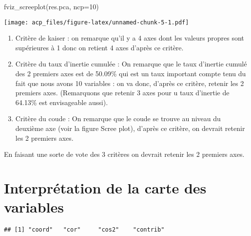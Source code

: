 \documentclass[
]{article}
\newenvironment{Shaded}{\begin{snugshade}}{\end{snugshade}}
\newcommand{\AttributeTok}[1]{\textcolor[rgb]{0.77,0.63,0.00}{#1}}
\newcommand{\DecValTok}[1]{\textcolor[rgb]{0.00,0.00,0.81}{#1}}
\newcommand{\FunctionTok}[1]{\textcolor[rgb]{0.00,0.00,0.00}{#1}}
\newcommand{\NormalTok}[1]{#1}
\newcommand{\SpecialCharTok}[1]{\textcolor[rgb]{0.00,0.00,0.00}{#1}}
\begin{document}
\begin{Shaded}
\begin{Highlighting}[]
\FunctionTok{fviz\_screeplot}\NormalTok{(res.pca, }\AttributeTok{ncp=}\DecValTok{10}\NormalTok{)}
\end{Highlighting}
\end{Shaded}

\texttt{[image: acp\_files/figure-latex/unnamed-chunk-5-1.pdf]}

\begin{enumerate}
\def\labelenumi{\alph{enumi})}
\item
  Critère de kaiser : on remarque qu'il y a 4 axes dont les valeurs
  propres sont supérieures à 1 donc on retient 4 axes d'après ce
  critère.
\item
  Critère du taux d'inertie cumulée : On remarque que le taux d'inertie
  cumulé des 2 premiers axes est de 50.09\% qui est un taux important
  compte tenu du fait que nous avons 10 variables : on va donc, d'après
  ce critère, retenir les 2 premiers axes. (Remarquons que retenir 3
  axes pour u taux d'inertie de 64.13\% est envisageable aussi).
\item
  Critère du coude : On remarque que le coude se trouve au niveau du
  deuxième axe (voir la figure Scree plot), d'après ce critère, on
  devrait retenir les 2 premiers axes.
\end{enumerate}

En faisant une sorte de vote des 3 critères on devrait retenir les 2
premiers axes.

\hypertarget{interpruxe9tation-de-la-carte-des-variables}{%
\section{Interprétation de la carte des
variables}\label{interpruxe9tation-de-la-carte-des-variables}}

\begin{Shaded}
\end{Shaded}

\begin{verbatim}
## [1] "coord"   "cor"     "cos2"    "contrib"
\end{verbatim}

\begin{Shaded}
\end{Shaded}
\end{document}
